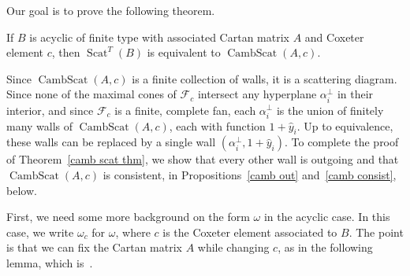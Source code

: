 \documentclass[ALCO,ThmDefs,Unicode,epreuves]{cedram}
\DeclareMathOperator{\Scat}{Scat}
\DeclareMathOperator{\CambScat}{CambScat}
\newcommand{\F}{{\mathcal F}}
\newcommand{\ck}{\spcheck}
\newcommand{\hy}{\hat{y}}
\begin{document}
%


Our goal is to prove the following theorem.

\begin{theorem}\label{camb scat thm}
If $B$ is acyclic of finite type with associated Cartan matrix $A$ and Coxeter element $c$, then $\Scat^T(B)$ is equivalent to $\CambScat(A,c)$.
\end{theorem}

Since $\CambScat(A,c)$ is a finite collection of walls, it is a scattering diagram.
Since none of the maximal cones of $\F_c$ intersect any hyperplane $\alpha_i^\perp$ in their interior, and since $\F_c$ is a finite, complete fan, each $\alpha_i^\perp$ is the union of finitely many walls of $\CambScat(A,c)$, each with function $1+\hy_i$.
Up to equivalence, these walls can be replaced by a single wall $(\alpha_i^\perp,1+\hy_i)$.
To complete the proof of Theorem~\ref{camb scat thm}, we show that every other wall is outgoing and that $\CambScat(A,c)$ is consistent, in Propositions~\ref{camb out} and~\ref{camb consist}, below.

First, we need some more background on the form $\omega$ in the acyclic case.
In this case, we write $\omega_c$ for $\omega$, where $c$ is the Coxeter element associated to $B$.
The point is that we can fix the Cartan matrix $A$ while changing $c$,
as in the following lemma, which is~\cite[Lemma~3.8]{typefree}.
\end{document}
